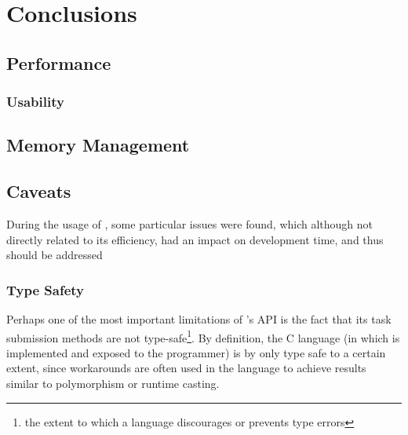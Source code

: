 \documentclass[main.tex]{subfiles}
\begin{document}
\chapter{Conclusions} \label{chapter:conclusions}

\section{Performance}


\subsection{Usability}




\section{Memory Management}


\section{\starpu Caveats}

During the usage of \starpu, some particular issues were found, which although not directly related to its efficiency, had an impact on development time, and thus should be addressed

\subsection{Type Safety}

Perhaps one of the most important limitations of \starpu's API is the fact that its task submission methods are not type-safe\footnote{the extent to which a language discourages or prevents type errors}. By definition, the C language (in which \starpu is implemented and exposed to the programmer) is by only type safe to a certain extent, since workarounds are often used in the language to achieve results similar to polymorphism or runtime casting.
\end{document}
